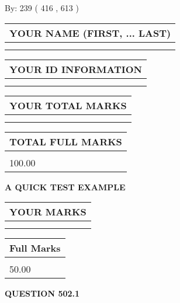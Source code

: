\documentclass[12pt]{article}
\begin{document}
   
\hspace{1.0in} By: 
 239 ( 416 ,  613 )
   
   
   
   
\newpage 
\setcounter{page}{ 
   502001 } 
   
   
   
   
\noindent\begin{tabular}{|l|}
\hline
YOUR NAME (FIRST, ... LAST)  \\
\hline
 \\ 
 \\ 
\hline
\end{tabular}
\hspace{0.05in} \begin{tabular}{|l|}
\hline
 YOUR   ID   INFORMATION  \\
\hline
 \\ 
 \\ 
\hline
\end{tabular}
   
   
\vspace{0.2in}\noindent\begin{tabular}{|l|}
\hline
YOUR TOTAL MARKS  \\
\hline
 \\ 
 \\ 
\hline
\end{tabular}
\hspace{0.05in} \begin{tabular}{|l|}
\hline
TOTAL FULL MARKS  \\
\hline
 \\ 
100.00 \\
\hline
\end{tabular}
   
   
 \vspace{0.2in}
{\LARGE {\textbf{ A QUICK TEST EXAMPLE}}}
   
   
  
\vspace{0.2in}
  
\noindent\begin{tabular}{|l|}
\hline
 YOUR MARKS  \\
\hline
 \\ 
 \\ 
\hline
\end{tabular}
\hspace{0.05in} \begin{tabular}{|l|}
\hline
 Full Marks  \\
\hline
 \\ 
50.00 \\
\hline
\end{tabular}
{\textbf{\Large{QUESTION
502.1 
}}}
  
\end{document}
